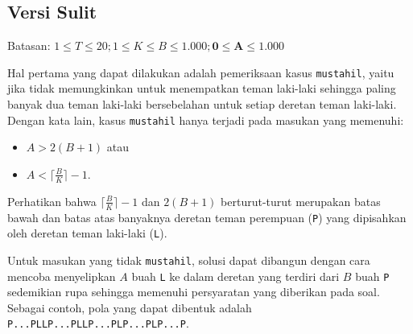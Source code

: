 \documentclass[../main_editorial.tex]{subfiles} %
\begin{document}
\subsection*{Versi Sulit}

Batasan: $1 \le T \le 20; 1 \le K \le B \le 1.000; \mathbf{0 \le A \le 1.000}$

Hal pertama yang dapat dilakukan adalah pemeriksaan kasus \texttt{mustahil}, yaitu jika tidak memungkinkan untuk menempatkan teman laki-laki sehingga paling banyak dua teman laki-laki bersebelahan untuk setiap deretan teman laki-laki. Dengan kata lain, kasus \texttt{mustahil} hanya terjadi pada masukan yang memenuhi:
\begin{itemize}
	\item $A > 2(B + 1)$ atau
	\item $A < \lceil \frac{B}{K} \rceil - 1$.
\end{itemize}

Perhatikan bahwa $\lceil \frac{B}{K} \rceil - 1$ dan $2(B + 1)$ berturut-turut merupakan batas bawah dan batas atas banyaknya deretan teman perempuan (\texttt{P}) yang dipisahkan oleh deretan teman laki-laki (\texttt{L}).

Untuk masukan yang tidak \texttt{mustahil}, solusi dapat dibangun dengan cara mencoba menyelipkan $A$ buah \texttt{L} ke dalam deretan yang terdiri dari $B$ buah \texttt{P} sedemikian rupa sehingga memenuhi persyaratan yang diberikan pada soal. Sebagai contoh, pola yang dapat dibentuk adalah \texttt{P...PLLP...PLLP...PLP...PLP...P}.
\end{document}
